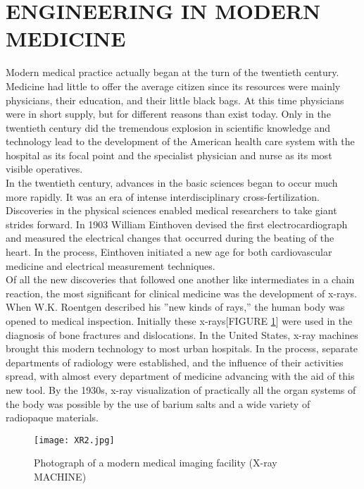 \documentclass[12pt]{article}
\begin{document}
\section{ENGINEERING IN MODERN MEDICINE}
Modern medical practice actually began at the turn of the twentieth century.
Medicine had little to offer the average citizen since its resources were mainly physicians, their education, and their little black bags.
At this time physicians were in short supply, but for different reasons than exist today.
Only in the twentieth century did the tremendous explosion in scientific knowledge and technology lead to the development of the American health care system with the hospital as its focal point and the specialist physician and nurse as its most visible operatives.\\


In the twentieth century, advances in the basic sciences began to occur much more rapidly.
It was an era of intense interdisciplinary cross-fertilization.
Discoveries in the physical sciences enabled medical researchers to take giant strides forward.
In 1903 William Einthoven devised the first electrocardiograph and measured the electrical changes that occurred during the beating of the heart.
In the process, Einthoven initiated a new age for both cardiovascular medicine and electrical measurement techniques.\\



Of all the new discoveries that followed one another like intermediates in a chain reaction, the most significant for clinical medicine was the development of x-rays.
When W.K. Roentgen described his ''new kinds of rays,'' the human body was opened to medical inspection.
Initially these x-rays[FIGURE \ref{fig_XR2}] were used in the diagnosis of bone fractures and dislocations.
In the United States, x-ray machines brought this modern technology to most urban hospitals.
In the process, separate departments of radiology were established, and the influence of their activities spread, with almost every department of medicine advancing with the aid of this new tool.
By the 1930s, x-ray visualization of practically all the organ systems of the body was possible by the use of barium salts and a wide variety of radiopaque materials.\\
\begin{figure}[h]
\centering
\texttt{[image: XR2.jpg]}
\caption{Photograph of a modern medical imaging facility (X-ray MACHINE)
}
\label{fig_XR2}
\end{figure}
\end{document}
